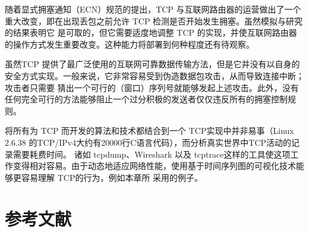 随着显式拥塞通知（ECN）规范的提出，TCP 与互联网路由器的运营做出了一个重大改变，即在出现丢包之前允许 TCP 检测是否开始发生拥塞。虽然模拟与研究的结果表明它
是可取的，但它需要适度地调整 TCP 的实现，并使互联网路由器的操作方式发生重要改变。这种能力将部署到何种程度还有待观察。

虽然TCP 提供了最广泛使用的互联网可靠数据传输方法，但是它并没有以自身的安全方式实现。一般来说，它非常容易受到伪造数据包攻击，从而导致连接中断；攻击者只需要
猜出一个可行的（窗口）序列号就能够发起上述攻击。此外，没有任何完全可行的方法能够阻止一个过分积极的发送者仅仅违反所有的拥塞控制规则。


将所有为 TCP 而开发的算法和技术都结合到一个 TCP实现中并非易事（Linux 2.6.38 的TCP/IPv4大约有20000行C语言代码），而分析真实世界中TCP活动的记录需要耗费时间。
诸如 tcpdump、Wireshark 以及 tcptrace这样的工具使这项工作变得相对容易。由于动态地适应网络性能，使用基于时间序列图的可视化技术能够更容易理解 TCP的行为，例如本章所
采用的例子。

\section{参考文献}